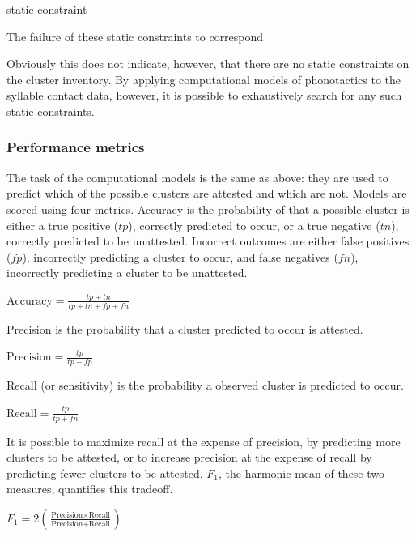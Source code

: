 static constraint 

The failure of these static constraints to correspond

Obviously this does not indicate, however, that there are no static constraints on the cluster inventory. By applying computational models of phonotactics to the syllable contact data, however, it is possible to exhaustively search for any such static constraints. 

\subsubsection{Performance metrics}

The task of the computational models is the same as above: they are used to predict which of the possible clusters are attested and which are not. Models are scored using four metrics. Accuracy is the probability of that a possible cluster is either a true positive ($tp$), correctly predicted to occur, or a true negative ($tn$), correctly predicted to be unattested. Incorrect outcomes are either false positives ($fp$), incorrectly predicting a cluster to occur, and false negatives ($fn$), incorrectly predicting a cluster to be unattested.

\begin{unlabeledexample}
$\displaystyle \textrm{Accuracy} = \frac{tp + tn}{tp + tn + fp + fn}$
\end{unlabeledexample}

Precision is the probability that a cluster predicted to occur is attested. 

\begin{unlabeledexample}
$\displaystyle \textrm{Precision} = \frac{tp}{tp + fp}$ 
\end{unlabeledexample}

Recall (or sensitivity) is the probability a observed cluster is predicted to occur.

\begin{unlabeledexample}
$\displaystyle \textrm{Recall} = \frac{tp}{tp + fn}$
\end{unlabeledexample}

It is possible to maximize recall at the expense of precision, by predicting more clusters to be attested, or to increase precision at the expense of recall by predicting fewer clusters to be attested. $F_1$, the harmonic mean of these two measures, quantifies this tradeoff.

\begin{unlabeledexample}
$\displaystyle F_1 = 2 \left( \frac{\textrm{Precision} \times \textrm{Recall}}{\textrm{Precision} + \textrm{Recall}}\right)$
\end{unlabeledexample}

